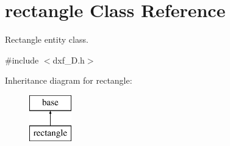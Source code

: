 \hypertarget{classrectangle}{\section{rectangle Class Reference}
\label{classrectangle}
}


Rectangle entity class.  




{\ttfamily \#include $<$dxf\-\_\-D.\-h$>$}

Inheritance diagram for rectangle\-:\begin{figure}[H]
\begin{center}
\leavevmode
\includegraphics[height=2.000000cm]{classrectangle}
\end{center}
\end{figure}
